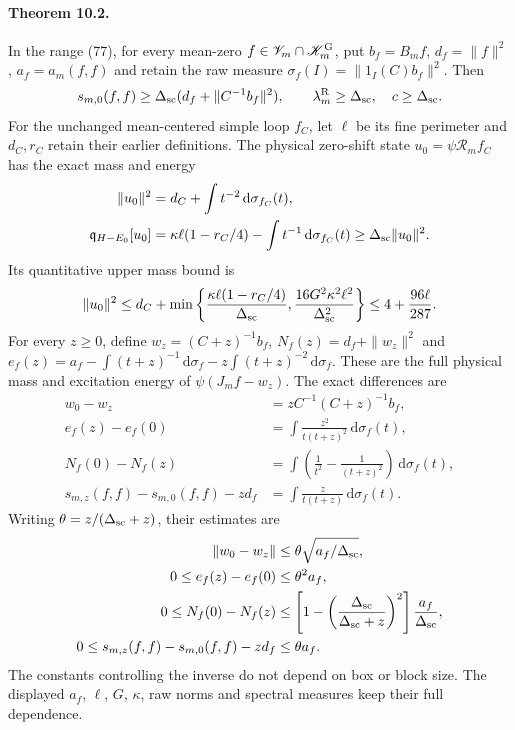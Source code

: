 \documentclass[11pt]{article}
\newcommand{\dd}{\,\mathrm d}
\newcommand{\KK}{\mathscr K}
\newcommand{\VV}{\mathscr V}
\begin{document}
\paragraph{Theorem 10.2.}
In the range (77), for every mean-zero
$f\in\VV_m\cap\KK_m^{\rm G}$, put $b_f=B_mf$,
$d_f=\|f\|^2$, $a_f=a_m(f,f)$ and retain the raw measure
$\sigma_f(I)=\|1_I(C)b_f\|^2$.
Then
\begin{equation}\label{eq:uniformzeroenergy}
 s_{m,0}(f,f)\geq\Delta_{\rm sc}
              (d_f+\|C^{-1}b_f\|^2),\qquad
 \lambda_m^{\rm R}\geq\Delta_{\rm sc},\quad c\geq\Delta_{\rm sc}.
\end{equation}
For the unchanged mean-centered simple loop $f_C$, let
$\ell$ be its fine perimeter and $d_C,r_C$ retain their earlier
definitions. The physical zero-shift state $u_0=\psi\mathcal R_m f_C$
has the exact mass and energy
\begin{align}
 \|u_0\|^2&=d_C+\int t^{-2}\dd\sigma_{f_C}(t),\label{eq:uniformloopmass}\\
 \mathfrak q_{H-E_0}[u_0]
 &=\kappa\ell(1-r_C/4)-\int t^{-1}\dd\sigma_{f_C}(t)
 \geq\Delta_{\rm sc}\|u_0\|^2.\label{eq:uniformloopenergy}
\end{align}
Its quantitative upper mass bound is
\begin{equation}\label{eq:uniformloopbound}
 \|u_0\|^2\leq d_C+
 \min\left\{\frac{\kappa\ell(1-r_C/4)}{\Delta_{\rm sc}},
             \frac{16G^2\kappa^2\ell^2}{\Delta_{\rm sc}^2}\right\}
 \leq4+\frac{96\ell}{287}.
\end{equation}
For every $z\geq0$, define $w_z=(C+z)^{-1}b_f$,
$N_f(z)=d_f+\|w_z\|^2$ and
$e_f(z)=a_f-\int(t+z)^{-1}\dd\sigma_f
                    -z\int(t+z)^{-2}\dd\sigma_f$.
These are the full physical mass and excitation energy of
$\psi(J_mf-w_z)$. The exact differences are
\begin{align}
 w_0-w_z&=zC^{-1}(C+z)^{-1}b_f,\label{eq:uniformwdiff}\\
 e_f(z)-e_f(0)&=\int\frac{z^2}{t(t+z)^2}\dd\sigma_f(t),
                                                        \label{eq:uniformediff}\\
 N_f(0)-N_f(z)&=\int\left(\frac1{t^2}-\frac1{(t+z)^2}\right)
                                      \dd\sigma_f(t),    \label{eq:uniformndiff}\\
 s_{m,z}(f,f)-s_{m,0}(f,f)-zd_f
 &=\int\frac{z}{t(t+z)}\dd\sigma_f(t).    \label{eq:uniformmemorydiff}
\end{align}
Writing $\theta=z/(\Delta_{\rm sc}+z)$, their estimates are
\begin{align}
 \|w_0-w_z\|&\leq\theta\sqrt{a_f/\Delta_{\rm sc}},\nonumber\\
 0\leq e_f(z)-e_f(0)&\leq\theta^2a_f,\nonumber\\
 0\leq N_f(0)-N_f(z)&\leq
 \left[1-\left(\frac{\Delta_{\rm sc}}{\Delta_{\rm sc}+z}\right)^2\right]
 \frac{a_f}{\Delta_{\rm sc}},\nonumber\\
 0\leq s_{m,z}(f,f)-s_{m,0}(f,f)-zd_f&\leq\theta a_f.
                                                        \label{eq:uniformcontinuity}
\end{align}
The constants controlling the inverse do not depend on box or block
size. The displayed $a_f$, $\ell$, $G$, $\kappa$, raw norms and
spectral measures keep their full dependence.
\end{document}
